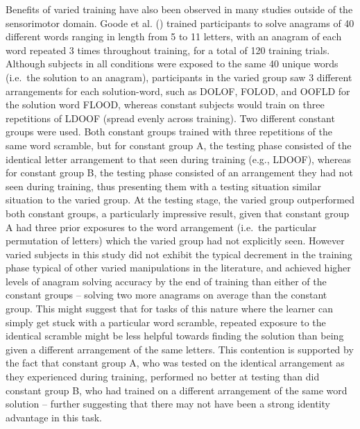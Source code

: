 \documentclass[
  11pt,
  letterpaper,
]{article}
\begin{document}
Benefits of varied training have also been observed in many studies
outside of the sensorimotor domain. Goode et al.
() trained
participants to solve anagrams of 40 different words ranging in length
from 5 to 11 letters, with an anagram of each word repeated 3 times
throughout training, for a total of 120 training trials. Although
subjects in all conditions were exposed to the same 40 unique words
(i.e.~the solution to an anagram), participants in the varied group saw
3 different arrangements for each solution-word, such as DOLOF, FOLOD,
and OOFLD for the solution word FLOOD, whereas constant subjects would
train on three repetitions of LDOOF (spread evenly across training). Two
different constant groups were used. Both constant groups trained with
three repetitions of the same word scramble, but for constant group A,
the testing phase consisted of the identical letter arrangement to that
seen during training (e.g., LDOOF), whereas for constant group B, the
testing phase consisted of an arrangement they had not seen during
training, thus presenting them with a testing situation similar
situation to the varied group. At the testing stage, the varied group
outperformed both constant groups, a particularly impressive result,
given that constant group A had three prior exposures to the word
arrangement (i.e.~the particular permutation of letters) which the
varied group had not explicitly seen. However varied subjects in this
study did not exhibit the typical decrement in the training phase
typical of other varied manipulations in the literature, and achieved
higher levels of anagram solving accuracy by the end of training than
either of the constant groups -- solving two more anagrams on average
than the constant group. This might suggest that for tasks of this
nature where the learner can simply get stuck with a particular word
scramble, repeated exposure to the identical scramble might be less
helpful towards finding the solution than being given a different
arrangement of the same letters. This contention is supported by the
fact that constant group A, who was tested on the identical arrangement
as they experienced during training, performed no better at testing than
did constant group B, who had trained on a different arrangement of the
same word solution -- further suggesting that there may not have been a
strong identity advantage in this task.
\end{document}
